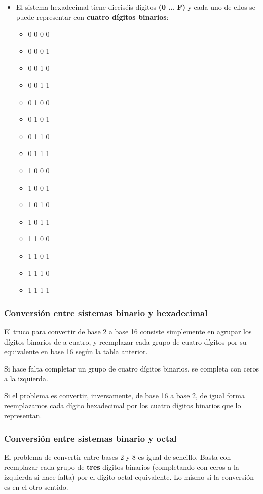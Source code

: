 \documentclass[spanish,A4,]{article}
\begin{document}
\begin{itemize}
\itemsep1pt\parskip0pt
\item
  El sistema hexadecimal tiene dieciséis dígitos \textbf{(0 \ldots{} F)}
  y cada uno de ellos se puede representar con \textbf{cuatro dígitos
  binarios}:

  \begin{itemize}
  \itemsep1pt\parskip0pt
  \item
    0 0 0 0
  \item
    0 0 0 1
  \item
    0 0 1 0
  \item
    0 0 1 1
  \item
    0 1 0 0
  \item
    0 1 0 1
  \item
    0 1 1 0
  \item
    0 1 1 1
  \item
    1 0 0 0
  \item
    1 0 0 1
  \item
    1 0 1 0
  \item
    1 0 1 1
  \item
    1 1 0 0
  \item
    1 1 0 1
  \item
    1 1 1 0
  \item
    1 1 1 1
  \end{itemize}
\end{itemize}

\subsubsection{Conversión entre sistemas binario y
hexadecimal}\label{conversiuxf3n-entre-sistemas-binario-y-hexadecimal}

El truco para convertir de base 2 a base 16 consiste simplemente en
agrupar los dígitos binarios de a cuatro, y reemplazar cada grupo de
cuatro dígitos por su equivalente en base 16 según la tabla anterior.

Si hace falta completar un grupo de cuatro dígitos binarios, se completa
con ceros a la izquierda.

Si el problema es convertir, inversamente, de base 16 a base 2, de igual
forma reemplazamos cada dígito hexadecimal por los cuatro dígitos
binarios que lo representan.

\subsubsection{Conversión entre sistemas binario y
octal}\label{conversiuxf3n-entre-sistemas-binario-y-octal}

El problema de convertir entre bases 2 y 8 es igual de sencillo. Basta
con reemplazar cada grupo de \textbf{tres} dígitos binarios (completando
con ceros a la izquierda si hace falta) por el dígito octal equivalente.
Lo mismo si la conversión es en el otro sentido.
\end{document}
